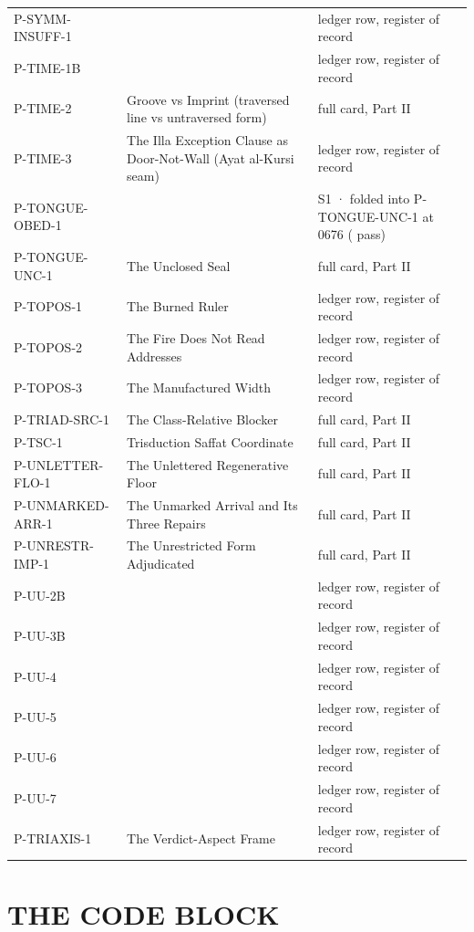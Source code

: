 \documentclass[10pt,twocolumn]{article}
\begin{document}
\begin{center}
\begin{longtable}{>{\raggedright\arraybackslash}p{}>{\raggedright\arraybackslash}p{}>{\raggedright\arraybackslash}p{}}
P-SYMM-INSUFF-1 &  & ledger row, register of record \\
P-TIME-1B &  & ledger row, register of record \\
P-TIME-2 & Groove vs Imprint (traversed line vs untraversed form) & full card, Part II \\
P-TIME-3 & The Illa Exception Clause as Door-Not-Wall (Ayat al-Kursi seam) & ledger row, register of record \\
P-TONGUE-OBED-1 &  & S1 · folded into P-TONGUE-UNC-1 at 0676 ( pass) \\
P-TONGUE-UNC-1 & The Unclosed Seal & full card, Part II \\
P-TOPOS-1 & The Burned Ruler & ledger row, register of record \\
P-TOPOS-2 & The Fire Does Not Read Addresses & ledger row, register of record \\
P-TOPOS-3 & The Manufactured Width & ledger row, register of record \\
P-TRIAD-SRC-1 & The Class-Relative Blocker & full card, Part II \\
P-TSC-1 & Trisduction Saffat Coordinate & full card, Part II \\
P-UNLETTER-FLO-1 & The Unlettered Regenerative Floor & full card, Part II \\
P-UNMARKED-ARR-1 & The Unmarked Arrival and Its Three Repairs & full card, Part II \\
P-UNRESTR-IMP-1 & The Unrestricted Form Adjudicated & full card, Part II \\
P-UU-2B &  & ledger row, register of record \\
P-UU-3B &  & ledger row, register of record \\
P-UU-4 &  & ledger row, register of record \\
P-UU-5 &  & ledger row, register of record \\
P-UU-6 &  & ledger row, register of record \\
P-UU-7 &  & ledger row, register of record \\
P-TRIAXIS-1 & The Verdict-Aspect Frame & ledger row, register of record \\
\end{longtable}
\end{center}

\twocolumn

\hypertarget{the-code-block}{%
\section{THE CODE BLOCK}\label{the-code-block}}
\end{document}
